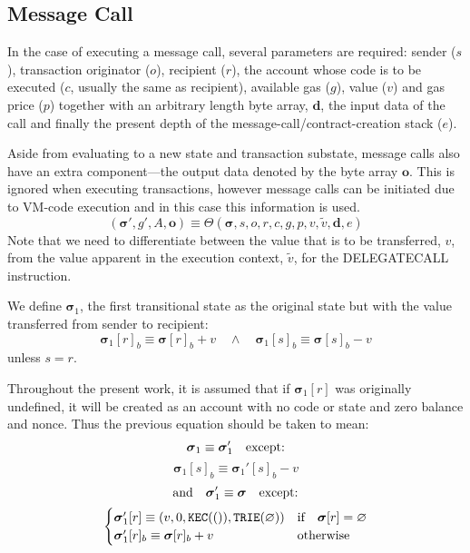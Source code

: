 \documentclass[9pt,oneside]{amsart}
\begin{document}
\begin{multicols}{2}
\section{Message Call} \label{ch:call}
In the case of executing a message call, several parameters are required: sender ($s$), transaction originator ($o$), recipient ($r$), the account whose code is to be executed ($c$, usually the same as recipient), available gas ($g$), value ($v$) and gas price ($p$) together with an arbitrary length byte array, $\mathbf{d}$, the input data of the call and finally the present depth of the message-call/contract-creation stack ($e$).

Aside from evaluating to a new state and transaction substate, message calls also have an extra component---the output data denoted by the byte array $\mathbf{o}$. This is ignored when executing transactions, however message calls can be initiated due to VM-code execution and in this case this information is used.
\begin{equation}
(\boldsymbol{\sigma}', g', A, \mathbf{o}) \equiv \Theta(\boldsymbol{\sigma}, s, o, r, c, g, p, v, \tilde{v}, \mathbf{d}, e)
\end{equation}
Note that we need to differentiate between the value that is to be transferred, $v$, from the value apparent in the execution context, $\tilde{v}$, for the {\small DELEGATECALL} instruction.

We define $\boldsymbol{\sigma}_1$, the first transitional state as the original state but with the value transferred from sender to recipient:
\begin{equation}
\boldsymbol{\sigma}_1[r]_b \equiv \boldsymbol{\sigma}[r]_b + v \quad\wedge\quad \boldsymbol{\sigma}_1[s]_b \equiv \boldsymbol{\sigma}[s]_b - v
\end{equation}
unless $s = r$.

Throughout the present work, it is assumed that if $\boldsymbol{\sigma}_1[r]$ was originally undefined, it will be created as an account with no code or state and zero balance and nonce. Thus the previous equation should be taken to mean:
\begin{equation}
\boldsymbol{\sigma}_1 \equiv \boldsymbol{\sigma}_1' \quad \text{except:} \\
\end{equation}
\begin{equation}
\boldsymbol{\sigma}_1[s]_b \equiv \boldsymbol{\sigma}_1'[s]_b - v
\end{equation}
\begin{equation}
\text{and}\quad \boldsymbol{\sigma}_1' \equiv \boldsymbol{\sigma} \quad \text{except:} \\
\end{equation}
\begin{equation}
\begin{cases}
\boldsymbol{\sigma}_1'[r] \equiv (v, 0, \mathtt{\tiny KEC}(()), \mathtt{\tiny TRIE}(\varnothing)) & \text{if} \quad \boldsymbol{\sigma}[r] = \varnothing \\
\boldsymbol{\sigma}_1'[r]_b \equiv \boldsymbol{\sigma}[r]_b + v & \text{otherwise}
\end{cases}
\end{equation}


\end{multicols}
\end{document}

